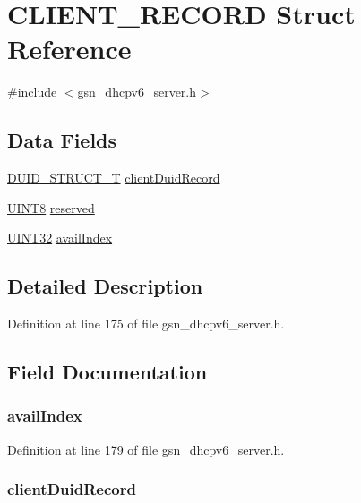 \hypertarget{a00011}{
\section{CLIENT\_\-RECORD Struct Reference}
\label{a00011}
}


{\ttfamily \#include $<$gsn\_\-dhcpv6\_\-server.h$>$}

\subsection*{Data Fields}
\begin{DoxyCompactItemize}
\item 
\hyperlink{a00017}{DUID\_\-STRUCT\_\-T} \hyperlink{a00011_ab7da22415acb965f3d19c0b24e4e6ee1}{clientDuidRecord}
\item 
\hyperlink{a00660_gab27e9918b538ce9d8ca692479b375b6a}{UINT8} \hyperlink{a00011_a61b1cfce69fc0011cd7b07b127a3f3f6}{reserved}
\item 
\hyperlink{a00660_gae1e6edbbc26d6fbc71a90190d0266018}{UINT32} \hyperlink{a00011_a2187044b2246b23932147cb8d1f319ee}{availIndex}
\end{DoxyCompactItemize}


\subsection{Detailed Description}


Definition at line 175 of file gsn\_\-dhcpv6\_\-server.h.



\subsection{Field Documentation}
\hypertarget{a00011_a2187044b2246b23932147cb8d1f319ee}{
\subsubsection[{availIndex}]{ {\bf availIndex}}}
\label{a00011_a2187044b2246b23932147cb8d1f319ee}


Definition at line 179 of file gsn\_\-dhcpv6\_\-server.h.

\hypertarget{a00011_ab7da22415acb965f3d19c0b24e4e6ee1}{
\subsubsection[{clientDuidRecord}]{ {\bf clientDuidRecord}}}
\label{a00011_ab7da22415acb965f3d19c0b24e4e6ee1}


